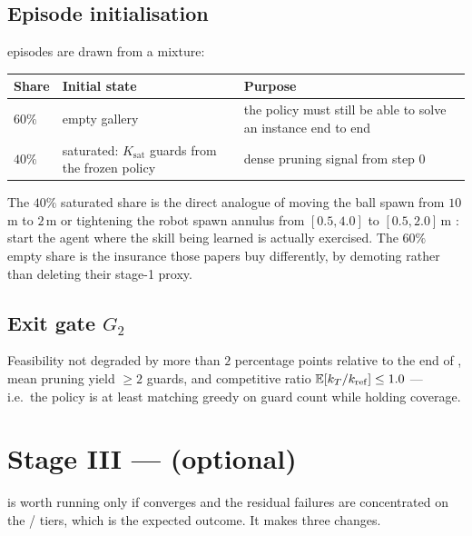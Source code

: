 \documentclass[11pt,a4paper]{article}
\begin{document}
\subsection{Episode initialisation}

\stageII{} episodes are drawn from a mixture:

\begin{center}
\small
\begin{tabularx}{\linewidth}{@{}l l X@{}}
\toprule
\textbf{Share} & \textbf{Initial state} & \textbf{Purpose} \\
\midrule
$60\%$ & empty gallery & the policy must still be able to solve an instance end to end \\
$40\%$ & saturated: $K_{\mathrm{sat}}$ guards from the frozen \stageI{} policy & dense pruning signal from step $0$ \\
\bottomrule
\end{tabularx}
\end{center}

The $40\%$ saturated share is the direct analogue of moving the ball spawn from $10$\,m to
$2$\,m \cite{wang2025dribble} or tightening the robot spawn annulus from $[0.5,4.0]$ to
$[0.5,2.0]$\,m \cite{xu2025striker}: start the agent where the skill being learned is
actually exercised. The $60\%$ empty share is the insurance those papers buy differently,
by demoting rather than deleting their stage-1 proxy.

\subsection{Exit gate $G_2$}

Feasibility not degraded by more than $2$ percentage points relative to the end of
\stageI{}, mean pruning yield $\ge 2$ guards, and competitive ratio
$\mathbb{E}[k_T/k_{\mathrm{ref}}] \le 1.0$ --- i.e.\ the policy is at least matching greedy on guard
count while holding coverage.

\section{Stage III --- \stageIII{} (optional)}

\stageIII{} is worth running only if \stageII{} converges and the residual failures are
concentrated on the / tiers, which is the expected outcome. It
makes three changes.
\end{document}
